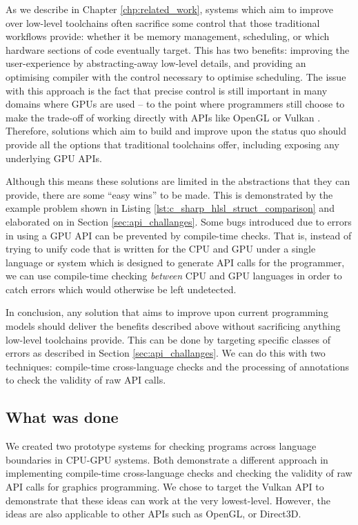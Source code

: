 \documentclass[a4paper,12pt,twoside,openright]{report}
\begin{document}
As we describe in Chapter \ref{chp:related_work}, systems which aim to improve
over low-level toolchains often sacrifice some control that those traditional
workflows provide: whether it be memory management, scheduling, or which
hardware sections of code eventually target. This has two benefits: improving
the user-experience by abstracting-away low-level details, and providing an
optimising compiler with the control necessary to optimise scheduling. The
issue with this approach is the fact that precise control is still important in
many domains where GPUs are used -- to the point where programmers still choose
to make the trade-off of working directly with APIs like OpenGL or Vulkan
\cite{ListOfOpenGLGames} \cite{ListOfVulkanGames}. Therefore, solutions which
aim to build and improve upon the status quo should provide all the options
that traditional toolchains offer, including exposing any underlying GPU APIs.

Although this means these solutions are limited in the abstractions that they
can provide, there are some ``easy wins'' to be made. This is demonstrated by
the example problem shown in Listing \ref{lst:c_sharp_hlsl_struct_comparison}
and elaborated on in Section \ref{sec:api_challanges}. Some bugs introduced due
to errors in using a GPU API can be prevented by compile-time checks. That is,
instead of trying to unify code that is written for the CPU and GPU under a
single language or system which is designed to generate API calls for the
programmer, we can use compile-time checking \textit{between} CPU and GPU
languages in order to catch errors which would otherwise be left undetected.

In conclusion, any solution that aims to improve upon current programming
models should deliver the benefits described above without sacrificing anything
low-level toolchains provide. This can be done by targeting specific classes of
errors as described in Section \ref{sec:api_challanges}. We can do this with
two techniques: compile-time cross-language checks and the processing of
annotations to check the validity of raw API calls.

\subsection{What was done}

\label{sec:what_was_done}

We created two prototype systems for checking programs across language
boundaries in CPU-GPU systems. Both demonstrate a different approach in
implementing compile-time cross-language checks and checking the validity of
raw API calls for graphics programming. We chose to target the Vulkan API to
demonstrate that these ideas can work at the very lowest-level. However, the
ideas are also applicable to other APIs such as OpenGL, or Direct3D.
\end{document}
